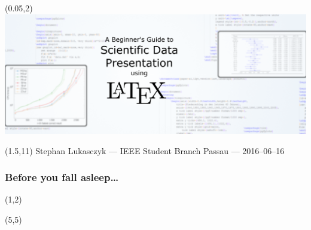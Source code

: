 \documentclass[t]{beamer}
\begin{document}
\begin{frame}[plain,label=titel]
  \begin{textblock}{0}(0.05,2)
    \includegraphics{banner}
  \end{textblock}
  \begin{textblock}{20}(1.5,11)
    \small Stephan Lukasczyk — IEEE Student Branch Passau — 2016--06--16
  \end{textblock}
\end{frame}

\begin{frame}
  \frametitle{Before you fall asleep\dots}
  \begin{textblock}{0}(1,2)
  \end{textblock}

  \begin{textblock}{0}(5,5)
  \end{textblock}

\end{frame}
\end{document}
